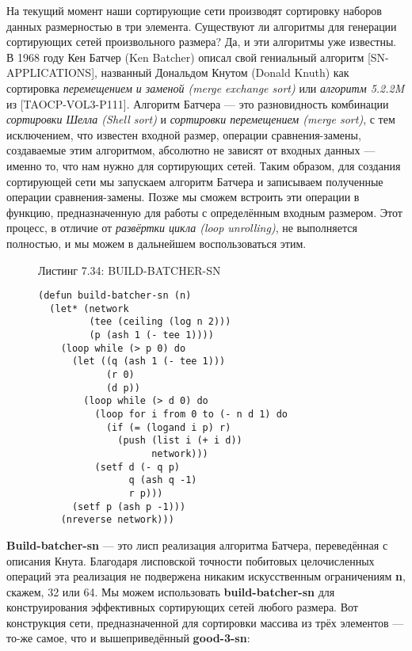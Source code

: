 На текущий момент наши сортирующие сети производят сортировку наборов данных размерностью в три элемента. Существуют ли алгоритмы для генерации сортирующих сетей произвольного размера? Да, и эти алгоритмы уже известны. В 1968 году Кен Батчер (Ken Batcher) описал свой гениальный алгоритм [SN-APPLICATIONS], названный Дональдом Кнутом (Donald Knuth) как сортировка \emph{перемещением и заменой (merge exchange sort)} или \emph{алгоритм 5.2.2M} из [TAOCP-VOL3-P111]. Алгоритм Батчера --- это разновидность комбинации \emph{сортировки Шелла (Shell sort)} и \emph{сортировки перемещением (merge sort)}, с тем исключением, что известен входной размер, операции сравнения-замены, создаваемые этим алгоритмом, абсолютно не зависят от входных данных --- именно то, что нам нужно для сортирующих сетей. Таким образом, для создания сортирующей сети мы запускаем алгоритм Батчера и записываем полученные операции сравнения-замены. Позже мы сможем встроить эти операции в функцию, предназначенную для работы с определённым входным размером. Этот процесс, в отличие от \emph{развёртки цикла (loop unrolling)}, не выполняется полностью, и мы можем в дальнейшем воспользоваться этим.

\begin{figure}Листинг 7.34: BUILD-BATCHER-SN\label{listing_7.34}
\listbegin
\begin{verbatim}
(defun build-batcher-sn (n)
  (let* (network
         (tee (ceiling (log n 2)))
         (p (ash 1 (- tee 1))))
    (loop while (> p 0) do
      (let ((q (ash 1 (- tee 1)))
            (r 0)
            (d p))
        (loop while (> d 0) do
          (loop for i from 0 to (- n d 1) do
            (if (= (logand i p) r)
              (push (list i (+ i d))
                    network)))
          (setf d (- q p)
                q (ash q -1)
                r p)))
      (setf p (ash p -1)))
    (nreverse network)))
\end{verbatim}
\listend
\end{figure}

\textbf{Build-batcher-sn} --- это лисп реализация алгоритма Батчера, переведённая с описания Кнута. Благодаря лисповской точности побитовых целочисленных операций эта реализация не подвержена никаким искусственным ограничениям \textbf{n}, скажем, 32 или 64. Мы можем использовать \textbf{build-batcher-sn} для конструирования эффективных сортирующих сетей любого размера. Вот конструкция сети, предназначенной для сортировки массива из трёх элементов --- то-же самое, что и вышеприведённый \textbf{good-3-sn}:

